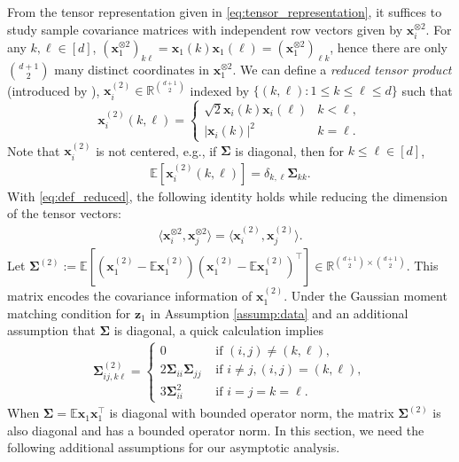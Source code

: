 \documentclass[twoside,11pt]{article}
\newcommand{\E}{\mathbb{E}}
\def\bx{{\boldsymbol x}}
\def\bz{{\boldsymbol z}}
\def\bSigma{{\boldsymbol \Sigma}}
\newcommand{\1}{\mathbf{1}}
\newcommand{\abs}[1]{\left|#1\right|}
\begin{document}
From the tensor representation given in \eqref{eq:tensor_representation}, it suffices to study sample covariance matrices with independent row vectors given by $\bx_i^{\otimes 2}$. 
For any $k,\ell\in [d]$, 
   $(\bx_1^{\otimes 2})_{k\ell}= \bx_1(k) \bx_1(\ell)=(\bx_1^{\otimes 2})_{\ell k}$,
hence there are only $\binom{d+1}{2}$ many distinct coordinates in $\bx_1^{\otimes 2}$. We can define a \textit{reduced tensor product} (introduced by \cite{yaskov2023marchenko}), $\bx_i^{(2)}\in \mathbb R^{\binom{d+1}{2}}$ indexed by $\{(k,\ell): 1\le k\leq \ell\le d \}$ such that 
    \begin{equation}\label{eq:def_reduced}
    \bx_{i}^{(2)} (k,\ell)=
    \begin{cases}
        \sqrt{2}\bx_i(k)\bx_i(\ell) & k<\ell,\\
        \abs{\bx_i(k)}^2 & k=\ell.
    \end{cases}
    \end{equation}
Note that $\bx_i^{(2)}$ is not centered, e.g., if $\bSigma$ is diagonal, then for $k\le \ell\in [d]$, \begin{align}\label{eq:Ex2}
    \E[\bx_{i}^{(2)}(k,\ell)]=\delta_{k,\ell}\bSigma_{kk}.
    \end{align}
With \eqref{eq:def_reduced},  the following identity holds while reducing the dimension of the tensor vectors:
    \begin{align}\label{eq:tensor_product_identity}
        \langle \bx_i^{\otimes 2}, \bx_j^{\otimes 2}\rangle=\langle \bx_i^{(2)}, \bx_j^{(2)}\rangle.
    \end{align}
Let $\bSigma^{(2)}:=\E\left[(\bx_1^{(2)}-\E\bx_1^{(2)})  (\bx_1^{(2)}-\E\bx_1^{(2)}) ^\top \right]\in \mathbb R^{\binom{d+1}{2}\times \binom{d+1}{2}}$. This matrix encodes the covariance information of $\bx_1^{(2)}$. Under the Gaussian moment matching condition for $\bz_1$ in Assumption \ref{assump:data} and an additional assumption that  $\bSigma$ is diagonal, a quick calculation implies 
\begin{align} \label{eq:defSigma2}
\bSigma_{ij, k\ell}^{(2)}=\begin{cases}
    0 & \text{ if } (i,j)\not=(k,\ell),\\
    2\bSigma_{ii}\bSigma_{jj} &\text{ if } i\not=j, (i,j)=(k,\ell), \\
    3\bSigma_{ii}^2 &\text{ if } i=j=k=\ell.
\end{cases}
\end{align} 
 When  $\bSigma=\E\bx_1 \bx_1^\top$ is diagonal with bounded operator norm,  the matrix $\bSigma^{(2)}$ is also diagonal and has a bounded operator norm.   In this section, we need the following additional assumptions for our asymptotic analysis.
        
\end{document}
